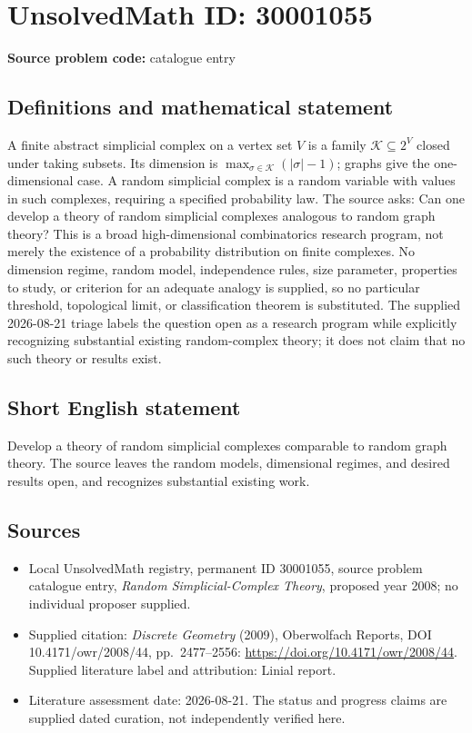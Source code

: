 \documentclass[11pt]{article}
\begin{document}
\section*{UnsolvedMath ID: 30001055}
\textbf{Source problem code:} catalogue entry
\subsection{Definitions and mathematical statement}
A finite abstract simplicial complex on a vertex set $V$ is a family $\mathcal K\subseteq2^V$ closed under taking subsets. Its dimension is $\max_{\sigma\in\mathcal K}(|\sigma|-1)$; graphs give the one-dimensional case. A random simplicial complex is a random variable with values in such complexes, requiring a specified probability law. The source asks: Can one develop a theory of random simplicial complexes analogous to random graph theory? This is a broad high-dimensional combinatorics research program, not merely the existence of a probability distribution on finite complexes. No dimension regime, random model, independence rules, size parameter, properties to study, or criterion for an adequate analogy is supplied, so no particular threshold, topological limit, or classification theorem is substituted. The supplied 2026-08-21 triage labels the question open as a research program while explicitly recognizing substantial existing random-complex theory; it does not claim that no such theory or results exist.
\subsection{Short English statement}
Develop a theory of random simplicial complexes comparable to random graph theory. The source leaves the random models, dimensional regimes, and desired results open, and recognizes substantial existing work.
\subsection{Sources}
\begin{itemize}\item Local UnsolvedMath registry, permanent ID 30001055, source problem catalogue entry, \emph{Random Simplicial-Complex Theory}, proposed year 2008; no individual proposer supplied.\item Supplied citation: \emph{Discrete Geometry} (2009), Oberwolfach Reports, DOI 10.4171/owr/2008/44, pp.\ 2477--2556: \url{https://doi.org/10.4171/owr/2008/44}. Supplied literature label and attribution: Linial report.\item Literature assessment date: 2026-08-21. The status and progress claims are supplied dated curation, not independently verified here.\end{itemize}
\end{document}
